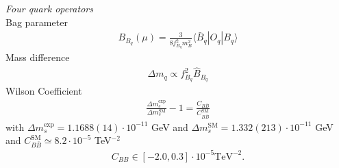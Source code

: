 \\ \\ \textit{Four quark operators}\\
Bag parameter \cite{1607.00299}
\begin{align}
 B_{B_q}(\mu) = \frac{3}{8f_{B_q}^2 m_B^2} \langle \bar B_q |O_q|B_q \rangle
\end{align}
Mass difference \cite{1102.0009}
\begin{align}
 \Delta m_q \propto f^2_{B_q} \hat{B}_{B_q}
\end{align}
Wilson Coefficient
\begin{align}
 \frac{\Delta m_s^\text{exp}}{\Delta m_s^\text{SM}}-1 = \frac{C_{B\bar B}}{C^\text{SM}_{B\bar B}}
\end{align}
with $\Delta m_s^\text{exp} = 1.1688(14) \cdot 10^{-11}$ GeV \cite{PDG} \cite{1602.03560} and $\Delta m_s^\text{SM} = 1.332(213)\cdot 10^{-11}$ GeV \cite{0612167}%
and $C_{B\bar B}^\text{SM} \simeq 8.2\cdot 10^{-5}$ TeV$^{-2}$ 
\begin{align}
 C_{BB} \in [-2.0,0.3] \cdot 10^{-5} \text{TeV}^{-2}.%
 \label{eq_mixBound}
\end{align}




